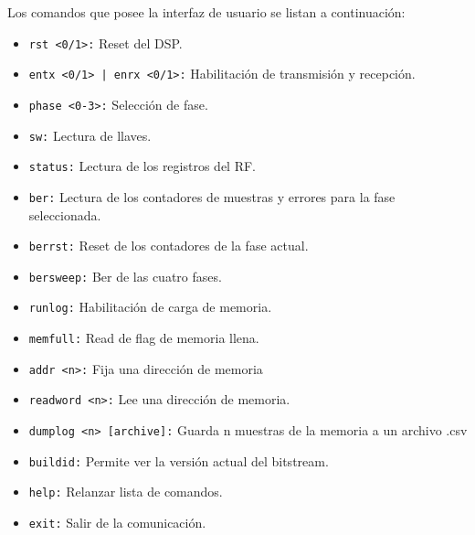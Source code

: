 \documentclass[12pt, a4paper]{article}
\begin{document}
        Los comandos que posee la interfaz de usuario se listan a continuación:
        \begin{itemize}
            \item \texttt{rst <0/1>:} Reset del DSP.
            \item \texttt{entx <0/1> | enrx <0/1>:} Habilitación de transmisión y recepción.
            \item \texttt{phase <0-3>:} Selección de fase.
            \item \texttt{sw:} Lectura de llaves.
            \item \texttt{status:} Lectura de los registros del RF.
            \item \texttt{ber:} Lectura de los contadores de muestras y errores para la fase seleccionada.
            \item \texttt{berrst:} Reset de los contadores de la fase actual.
            \item \texttt{bersweep:} Ber de las cuatro fases.
            \item \texttt{runlog:} Habilitación de carga de memoria.
            \item \texttt{memfull:} Read de flag de memoria llena.
            \item \texttt{addr <n>:} Fija una dirección de memoria
            \item \texttt{readword <n>:} Lee una dirección de memoria.
            \item \texttt{dumplog <n> [archive]:} Guarda n muestras de la memoria a un archivo .csv
            \item \texttt{buildid:} Permite ver la versión actual del bitstream.
            \item \texttt{help:} Relanzar lista de comandos.
            \item \texttt{exit:} Salir de la comunicación.
        \end{itemize}
\end{document}
